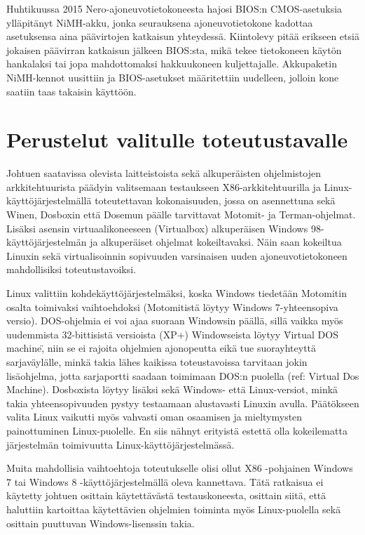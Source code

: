 Huhtikuussa 2015 Nero-ajoneuvotietokoneesta hajosi BIOS:n CMOS-asetuksia ylläpitänyt NiMH-akku, jonka seurauksena ajoneuvotietokone kadottaa asetuksensa aina päävirtojen katkaisun yhteydessä. Kiintolevy pitää erikseen etsiä jokaisen päävirran katkaisun jälkeen BIOS:sta, mikä tekee tietokoneen käytön hankalaksi tai jopa mahdottomaksi hakkuukoneen kuljettajalle. Akkupaketin NiMH-kennot uusittiin ja BIOS-asetukset määritettiin uudelleen, jolloin kone saatiin taas takaisin käyttöön.

\section{Perustelut valitulle toteutustavalle}

Johtuen saatavissa olevista laitteistoista sekä alkuperäisten ohjelmistojen arkkitehtuurista päädyin valitsemaan testaukseen X86-arkkitehtuurilla ja Linux-käyttöjärjestelmällä toteutettavan kokonaisuuden, jossa on asennettuna sekä Winen, Dosboxin että Dosemun päälle tarvittavat Motomit- ja Terman-ohjelmat. Lisäksi asensin virtuaalikoneeseen (Virtualbox) alkuperäisen Windows 98-käyttöjärjestelmän ja alkuperäiset ohjelmat kokeiltavaksi. Näin saan kokeiltua Linuxin sekä virtualisoinnin sopivuuden varsinaisen uuden ajoneuvotietokoneen mahdollisiksi toteutustavoiksi.

Linux valittiin kohdekäyttöjärjestelmäksi, koska Windows tiedetään Motomitin osalta toimivaksi vaihtoehdoksi (Motomitistä löytyy Windows 7-yhteensopiva versio). DOS-ohjelmia ei voi ajaa suoraan Windowsin päällä, sillä vaikka myös uudemmista 32-bittisistä versioista (XP+) Windowseista löytyy \"Virtual DOS machine\", niin se ei rajoita ohjelmien ajonopeutta eikä tue suorayhteyttä sarjaväylälle, minkä takia lähes kaikissa toteustavoissa tarvitaan jokin lisäohjelma, jotta sarjaportti saadaan toimimaan DOS:n puolella (ref: Virtual Dos Machine). Dosboxista löytyy lisäksi sekä Windows- että Linux-versiot, minkä takia yhteensopivuuden pystyy testaamaan alustavasti Linuxin avulla. Päätökseen valita Linux vaikutti myös vahvasti oman osaamisen ja mieltymysten painottuminen Linux-puolelle. En siis nähnyt erityistä estettä olla kokeilematta järjestelmän toimivuutta Linux-käyttöjärjestelmässä.

Muita mahdollisia vaihtoehtoja toteutukselle olisi ollut X86 -pohjainen Windows 7 tai Windows 8 -käyttöjärjestelmällä oleva kannettava. Tätä ratkaisua ei käytetty johtuen osittain käytettävästä testauskoneesta, osittain siitä, että haluttiin kartoittaa käytettävien ohjelmien toiminta myös Linux-puolella sekä osittain puuttuvan Windows-lisenssin takia.

